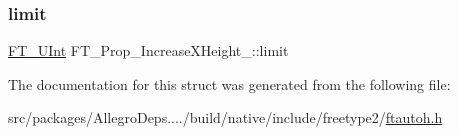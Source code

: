 \subsubsection{\texorpdfstring{limit}{limit}}
{\footnotesize\ttfamily \hyperlink{fttypes_8h_abcb8db4dbf35d2b55a9e8c7b0926dc52}{F\+T\+\_\+\+U\+Int} F\+T\+\_\+\+Prop\+\_\+\+Increase\+X\+Height\+\_\+\+::limit}



The documentation for this struct was generated from the following file\+:\begin{DoxyCompactItemize}
\item 
src/packages/\+Allegro\+Deps..../build/native/include/freetype2/\hyperlink{ftautoh_8h}{ftautoh.\+h}\end{DoxyCompactItemize}

